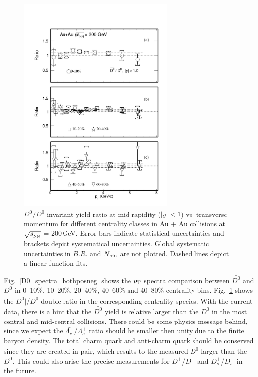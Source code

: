 \begin{figure}
\centering
\includegraphics[width=0.68\textwidth]{figure/Run14_D0HFT/D0_spectra_ratioposneg.pdf}
\caption{$\bar{D^{0}}$/$D^{0}$ invariant yield ratio at mid-rapidity ($|y|<1$) vs. transverse momentum for different centrality classes in Au + Au collisions at $\sqrt{s_{_{\rm NN}}}$ = 200\,GeV. Error bars indicate statistical uncertainties and brackets depict systematical uncertainties. Global systematic uncertainties in $B.R.$ and $N_{\rm bin}$ are not plotted. Dashed lines depict a linear function fits.}
\label{D0_spectra_ratioposneg} 
\end{figure}

Fig.~\ref{D0_spectra_bothposneg} shows the $p_{\rm T}$ spectra comparison between $\bar{D^{0}}$ and $D^0$ in 0--10\%, 10--20\%, 20--40\%, 40--60\% and 40--80\% centrality bins. Fig.~\ref{D0_spectra_ratioposneg} shows the $\bar{D^{0}}|$/$D^{0}$ double ratio in the corresponding centrality species. With the current data, there is a hint that the $\bar{D^{0}}$ yield is relative larger than the $D^{0}$ in the most central and mid-central collisions. There could be some physics message behind, since we expect the $\bar{\Lambda_{c}^-}$/$\Lambda_{c}^+$ ratio should be smaller then unity due to the finite baryon density. The total charm quark and anti-charm quark should be conserved since they are created in pair, which results to the measured $\bar{D^0}$ larger than the $D^0$. This could also arise the precise measurements for $D^{+}$/$D^{-}$ and $D_{s}^{+}$/$D_{s}^{-}$ in the future.


